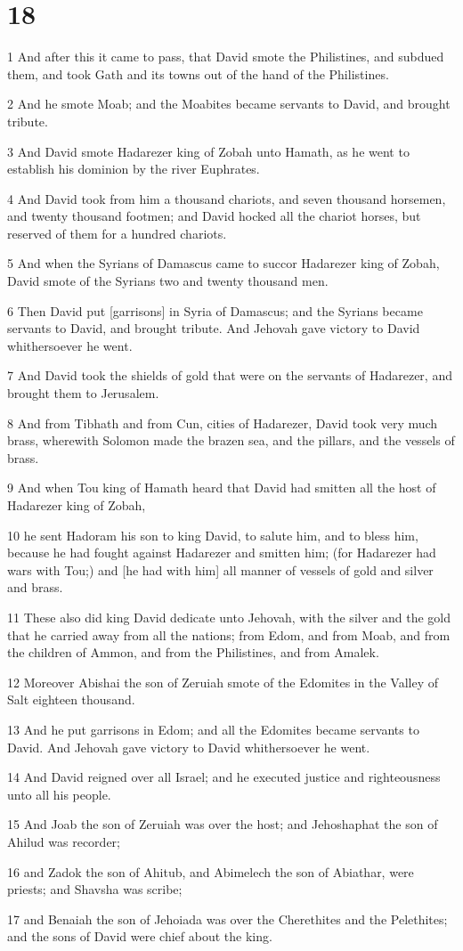 \chapter{18}

\par 1 And after this it came to pass, that David smote the Philistines, and subdued them, and took Gath and its towns out of the hand of the Philistines.
\par 2 And he smote Moab; and the Moabites became servants to David, and brought tribute.
\par 3 And David smote Hadarezer king of Zobah unto Hamath, as he went to establish his dominion by the river Euphrates.
\par 4 And David took from him a thousand chariots, and seven thousand horsemen, and twenty thousand footmen; and David hocked all the chariot horses, but reserved of them for a hundred chariots.
\par 5 And when the Syrians of Damascus came to succor Hadarezer king of Zobah, David smote of the Syrians two and twenty thousand men.
\par 6 Then David put [garrisons] in Syria of Damascus; and the Syrians became servants to David, and brought tribute. And Jehovah gave victory to David whithersoever he went.
\par 7 And David took the shields of gold that were on the servants of Hadarezer, and brought them to Jerusalem.
\par 8 And from Tibhath and from Cun, cities of Hadarezer, David took very much brass, wherewith Solomon made the brazen sea, and the pillars, and the vessels of brass.
\par 9 And when Tou king of Hamath heard that David had smitten all the host of Hadarezer king of Zobah,
\par 10 he sent Hadoram his son to king David, to salute him, and to bless him, because he had fought against Hadarezer and smitten him; (for Hadarezer had wars with Tou;) and [he had with him] all manner of vessels of gold and silver and brass.
\par 11 These also did king David dedicate unto Jehovah, with the silver and the gold that he carried away from all the nations; from Edom, and from Moab, and from the children of Ammon, and from the Philistines, and from Amalek.
\par 12 Moreover Abishai the son of Zeruiah smote of the Edomites in the Valley of Salt eighteen thousand.
\par 13 And he put garrisons in Edom; and all the Edomites became servants to David. And Jehovah gave victory to David whithersoever he went.
\par 14 And David reigned over all Israel; and he executed justice and righteousness unto all his people.
\par 15 And Joab the son of Zeruiah was over the host; and Jehoshaphat the son of Ahilud was recorder;
\par 16 and Zadok the son of Ahitub, and Abimelech the son of Abiathar, were priests; and Shavsha was scribe;
\par 17 and Benaiah the son of Jehoiada was over the Cherethites and the Pelethites; and the sons of David were chief about the king.

